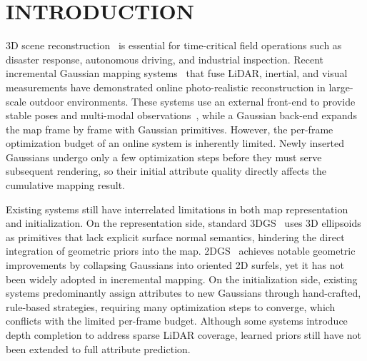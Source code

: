 \documentclass[letterpaper,journal]{IEEEtran}
\begin{document}

\section{INTRODUCTION}

 3D scene reconstruction~\cite{tosi2024nerfs,sucar2021imap,zhu2022nice,wang2023co} is essential for time-critical field operations such as disaster response, autonomous driving, and industrial inspection. Recent incremental Gaussian mapping systems~\cite{yugay2023gaussian,wu2024mm,zhao2024tclc} that fuse LiDAR, inertial, and visual measurements have demonstrated online photo-realistic reconstruction in large-scale outdoor environments. These systems use an external front-end to provide stable poses and multi-modal observations~\cite{lin2024r,zheng2024fast,lang2023coco}, while a Gaussian back-end expands the map frame by frame with Gaussian primitives. However, the per-frame optimization budget of an online system is inherently limited. Newly inserted Gaussians undergo only a few optimization steps before they must serve subsequent rendering, so their initial attribute quality directly affects the cumulative mapping result.

Existing systems still have interrelated limitations in both map representation and initialization. On the representation side, standard 3DGS~\cite{kerbl20233d} uses 3D ellipsoids as primitives that lack explicit surface normal semantics, hindering the direct integration of geometric priors into the map. 2DGS~\cite{huang20242d} achieves notable geometric improvements by collapsing Gaussians into oriented 2D surfels, yet it has not been widely adopted in incremental mapping. On the initialization side, existing systems predominantly assign attributes to new Gaussians through hand-crafted, rule-based strategies, requiring many optimization steps to converge, which conflicts with the limited per-frame budget. Although some systems introduce depth completion to address sparse LiDAR coverage, learned priors still have not been extended to full attribute prediction. 
\end{document}
